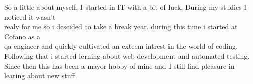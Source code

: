 \documentclass[9pt]{developercv} %
\begin{document}
    \begin{minipage}[t]{0.4\textwidth} %
        \vspace{-\baselineskip} %

        {
            So a little about myself. I started in IT with a bit of luck. During my studies I noticed it wasn't \\
            realy for me so i descided to take a break year.
            during this time i started at Cofano as a \\
            qa engineer and quickly cultivated an exteem intrest in the world of coding. \\
            Following that i started lerning about web development and automated testing.
            Since then this has been a mayor hobby of mine and I still find pleasure in learing about new stuff.
        }

    \end{minipage}
    \hfill %
    \begin{minipage}[t]{0.5\textwidth} %
        \vspace{-\baselineskip} %
        \begin{barchart}{5.5}
        \end{barchart}
    \end{minipage}


\end{document}
